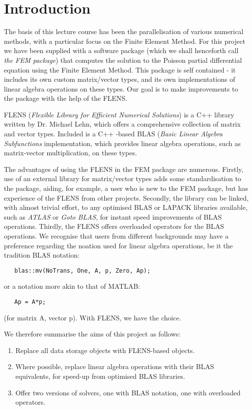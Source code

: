 
\section{Introduction}

The basis of this lecture course has been the parallelisation of various numerical methods, with a particular focus on the Finite Element Method. For this project we have been supplied with a software package (which we shall henceforth call \emph{the FEM package}) that computes the solution to the Poisson partial differential equation using the Finite Element Method. This package is self contained - it includes its own custom matrix/vector types, and its own implementations of linear algebra operations on these types. Our goal is to make improvements to the package with the help of the FLENS.

FLENS (\emph{Flexible Library for Efficient Numerical Solutions}) is a C++ library written by Dr. Michael Lehn, which offers a comprehensive collection of matrix and vector types. Included is a C++ -based BLAS (\emph{Basic Linear Algebra Subfunctions} implementation, which provides linear algebra operations, such as matrix-vector multiplication, on these types. 

The advantages of using the FLENS in the FEM package are numerous. Firstly, use of an external library for matrix/vector types adds some standardisation to the package, aiding, for example, a user who is new to the FEM package, but has experience of the FLENS from other projects. Secondly, the library can be linked, with almost trivial effort, to any optimised BLAS or LAPACK libraries available, such as \emph{ATLAS} or \emph{Goto BLAS}, for instant speed improvements of BLAS operations. Thirdly, the FLENS offers overloaded operators for the BLAS operations. We recognise that users from different backgrounds may have a preference regarding the noation used for linear algebra operations, be it the tradition BLAS notation:
\begin{lstlisting}
   blas::mv(NoTrans, One, A, p, Zero, Ap);
\end{lstlisting}
or a notation more akin to that of MATLAB:
\begin{lstlisting}
   Ap = A*p;
\end{lstlisting}
(for matrix A, vector p). With FLENS, we have the choice.

We therefore summarise the aims of this project as follows:
\begin{enumerate}
   \item Replace all data storage objects with FLENS-based objects.
   \item Where possible, replace linear algebra operations with their BLAS equivalents, for speed-up from optimised BLAS libraries.
   \item Offer two versions of solvers, one with BLAS notation, one with overloaded operators.
\end{enumerate}

